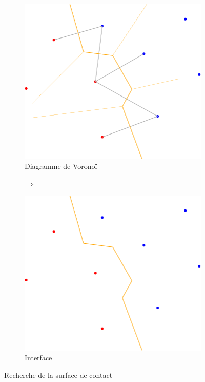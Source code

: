 \begin{figure}[ht]
\centering
\begin{subfigure}{0.45\textwidth}
  \centering
  \includegraphics[width=\textwidth]{figures/process_d_3.png}
  \caption{Diagramme de Voronoï}
  \label{fig::process_d_3}
\end{subfigure}%
\begin{subfigure}{0.1\textwidth}
  \centering
  $\Longrightarrow$
\end{subfigure}%
\begin{subfigure}{0.45\textwidth}
  \centering
  \includegraphics[width=\textwidth]{figures/process_d_4.png}
  \caption{Interface}
  \label{fig:process_d_4}
\end{subfigure}
\caption{Recherche de la surface de contact}
\label{fig:delaunays_process_2}
\end{figure}


